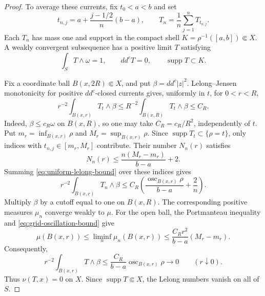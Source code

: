 \documentclass[11pt]{amsart}
\theoremstyle{definition}
\theoremstyle{remark}
\numberwithin{equation}{section}
\newcommand{\ddc}{dd^c}
\newcommand{\supp}{\operatorname{supp}}
\begin{document}
\begin{proof}
To average these currents, fix $t_0<a<b$ and set
\[
 t_{n,j}=a+\frac{j-1/2}{n}(b-a),\qquad
 T_n=\frac1n\sum_{j=1}^nT_{t_{n,j}}.
\]
Each $T_n$ has mass one and support in the compact shell
$K=\rho^{-1}([a,b])\Subset X$. A weakly convergent subsequence has
a positive limit $T$ satisfying
\[
 \int_S T\wedge\omega=1,\qquad \ddc T=0,
 \qquad\supp T\subset K.
\]

Fix a coordinate ball $B(x,2R)\Subset X$, and put
$\beta=\ddc|z|^2$. Lelong--Jensen monotonicity for positive
$\ddc$-closed currents \cite[Appendix~B, (B.1)--(B.2)]{DNS22} gives,
uniformly in $t$, for $0<r<R$,
\begin{equation}\label{eq:uniform-lelong-bound}
 r^{-2}\int_{B(x,r)}T_t\wedge\beta
 \le R^{-2}\int_{B(x,R)}T_t\wedge\beta\le C_R.
\end{equation}
Indeed, $\beta\le c_R\omega$ on $B(x,R)$, so one may take
$C_R=c_R/R^2$, independently of $t$. Put
$m_r=\inf_{B(x,r)}\rho$ and $M_r=\sup_{B(x,r)}\rho$.
Since $\supp T_t\subset\{\rho=t\}$, only indices with
$t_{n,j}\in[m_r,M_r]$ contribute. Their number $N_n(r)$ satisfies
\[
 N_n(r)\le\frac{n(M_r-m_r)}{b-a}+2.
\]
Summing \eqref{eq:uniform-lelong-bound} over these indices gives
\begin{equation}\label{eq:grid-oscillation-bound}
 r^{-2}\int_{B(x,r)}T_n\wedge\beta
 \le C_R\left(\frac{\operatorname{osc}_{B(x,r)}\rho}{b-a}
                  +\frac2n\right).
\end{equation}
Multiply $\beta$ by a cutoff equal to one on $B(x,R)$. The
corresponding positive measures $\mu_n$ converge weakly to $\mu$.
For the open ball, the Portmanteau inequality and
\eqref{eq:grid-oscillation-bound} give
\[
 \mu(B(x,r))\le\liminf_n\mu_n(B(x,r))
 \le\frac{C_Rr^2}{b-a}(M_r-m_r).
\]
Consequently,
\begin{equation}\label{eq:limit-oscillation-bound}
 r^{-2}\int_{B(x,r)}T\wedge\beta
 \le\frac{C_R}{b-a}\operatorname{osc}_{B(x,r)}\rho
 \longrightarrow0\qquad(r\downarrow0).
\end{equation}
Thus $\nu(T,x)=0$ on $X$. Since $\supp T\Subset X$, the Lelong
numbers vanish on all of $S$.
\end{proof}
\end{document}
